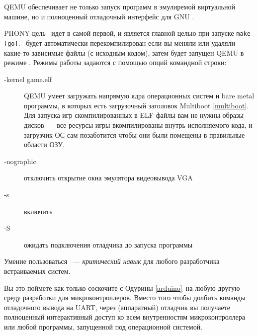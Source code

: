 \label{qemudebug}

QEMU обеспечивает не только запуск  программ в эмулиремой
виртуальной машине, но и полноценный отладочный интерфейс для GNU .


PHONY-цель \ идет в  самой первой, и является главной
целью при запуске \verb|make [go]|. \ будет автоматически
перекомпилирован если вы меняли или удаляли какие-то зависимые файлы (с
исходным кодом), затем будет запущен QEMU в режиме .
Режимы работы задаются с помощью опций командной строки:

\begin{description}
\item[-kernel game.elf] QEMU умеет загружать напрямую ядра операционных систем и
bare metal программы, в которых есть загрузочный заголовок Multiboot
\ref{multiboot}. Для запуска игр скомпилированных в ELF файлы вам не нужны
образы дисков\ --- все ресурсы игры вкомпилированы внутрь исполняемого
кода, и загрузчик ОС сам позаботится чтобы они были помещены в правильные
области ОЗУ.
\item[-nographic] отключить открытие окна эмулятора видеовывода VGA
\item[-s] включить 
\item[-S] ожидать подключения отладчика до запуска программы
\end{description}

\begin{framed}\noindent
Умение пользоваться \ --- \emph{критический навык} для
любого разработчика встраиваемых систем. 
\end{framed}
\noindent
Вы это поймете как только соскочите с Одурины \ref{arduino}\ на любую другую
среду разработки для микроконтроллеров. Вместо того чтобы долбить команды
отладочного вывода на UART, через (аппаратный) отладчик вы получаете полноценный
интерактивный доступ ко всем внутренностям микроконтроллера или любой программы,
запущенной под операционной системой.

